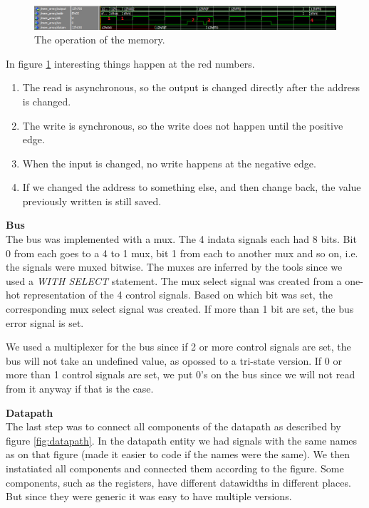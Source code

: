 \documentclass[a4paper,11pt]{article}
\begin{document}
\begin{figure}[h!]
  \centering
  \includegraphics[width=\linewidth]{inst_mem_2.PNG}
  \caption{The operation of the memory.}
  \label{fig:memory}
\end{figure}

In figure \ref{fig:memory} interesting things happen at the red numbers.

\begin{enumerate}
	\item The read is asynchronous, so the output is changed directly after the address is changed.
	\item The write is synchronous, so the write does not happen until the positive edge.
	\item When the input is changed, no write happens at the negative edge.
	\item If we changed the address to something else, and then change back, the value previously written is still saved.
\end{enumerate}

\textbf{Bus}\\
The bus was implemented with a mux. The 4 indata signals each had 8 bits. Bit 0 from each goes to a 4 to 1 mux, bit 1 from each to another mux and so on, i.e. the signals were muxed bitwise. The muxes are inferred by the tools since we used a \textit{WITH SELECT} statement. The mux select signal was created from a one-hot representation of the 4 control signals. Based on which bit was set, the corresponding mux select signal was created. If more than 1 bit are set, the bus error signal is set.

We used a multiplexer for the bus since if 2 or more control signals are set, the bus will not take an undefined value, as opossed to a tri-state version. If 0 or more than 1 control signals are set, we put 0's on the bus since we will not read from it anyway if that is the case.

\textbf{Datapath}\\
The last step was to connect all components of the datapath as described by figure \ref{fig:datapath}. In the datapath entity we had signals with the same names as on that figure (made it easier to code if the names were the same). We then instatiated all components and connected them according to the figure. Some components, such as the registers, have different datawidths in different places. But since they were generic it was easy to have multiple versions.
\end{document}
